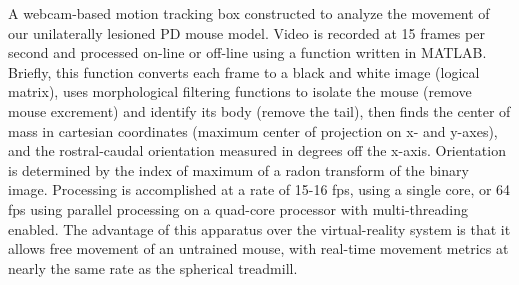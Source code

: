 A webcam-based motion tracking box constructed to analyze the movement
of our unilaterally lesioned PD mouse model. Video is recorded at 15
frames per second and processed on-line or off-line using a function
written in MATLAB. Briefly, this function converts each frame to a black
and white image (logical matrix), uses morphological filtering functions
to isolate the mouse (remove mouse excrement) and identify its body
(remove the tail), then finds the center of mass in cartesian
coordinates (maximum center of projection on x- and y-axes), and the
rostral-caudal orientation measured in degrees off the x-axis.
Orientation is determined by the index of maximum of a radon transform
of the binary image. Processing is accomplished at a rate of 15-16 fps,
using a single core, or 64 fps using parallel processing on a quad-core
processor with multi-threading enabled. The advantage of this apparatus
over the virtual-reality system is that it allows free movement of an
untrained mouse, with real-time movement metrics at nearly the same rate
as the spherical treadmill.






